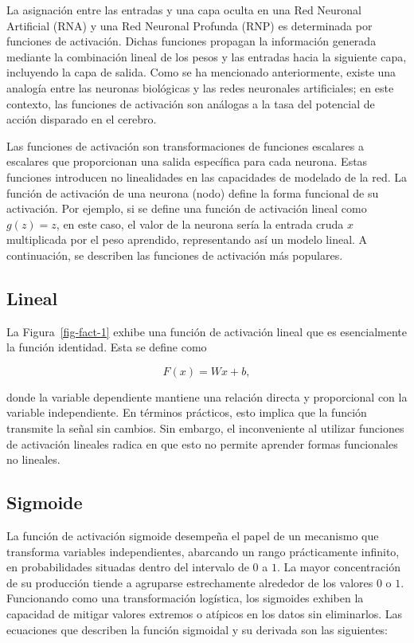 \documentclass[
  us-letterpaper,
]{scrreprt}
\theoremstyle{definition}
\theoremstyle{plain}
\theoremstyle{plain}
\theoremstyle{definition}
\theoremstyle{remark}
\begin{document}
La asignación entre las entradas y una capa oculta en una Red Neuronal
Artificial (RNA) y una Red Neuronal Profunda (RNP) es determinada por
funciones de activación. Dichas funciones propagan la información
generada mediante la combinación lineal de los pesos y las entradas
hacia la siguiente capa, incluyendo la capa de salida. Como se ha
mencionado anteriormente, existe una analogía entre las neuronas
biológicas y las redes neuronales artificiales; en este contexto, las
funciones de activación son análogas a la tasa del potencial de acción
disparado en el cerebro.

Las funciones de activación son transformaciones de funciones escalares
a escalares que proporcionan una salida específica para cada neurona.
Estas funciones introducen no linealidades en las capacidades de
modelado de la red. La función de activación de una neurona (nodo)
define la forma funcional de su activación. Por ejemplo, si se define
una función de activación lineal como \(g(z) = z\), en este caso, el
valor de la neurona sería la entrada cruda \(x\) multiplicada por el
peso aprendido, representando así un modelo lineal. A continuación, se
describen las funciones de activación más populares.

\subsection{Lineal}\label{lineal}

La Figura~\ref{fig-fact-1} exhibe una función de activación lineal que
es esencialmente la función identidad. Esta se define como

\[
F(x)=Wx + b,
\]

donde la variable dependiente mantiene una relación directa y
proporcional con la variable independiente. En términos prácticos, esto
implica que la función transmite la señal sin cambios. Sin embargo, el
inconveniente al utilizar funciones de activación lineales radica en que
esto no permite aprender formas funcionales no lineales.

\subsection{Sigmoide}\label{sigmoide}

La función de activación sigmoide desempeña el papel de un mecanismo que
transforma variables independientes, abarcando un rango prácticamente
infinito, en probabilidades situadas dentro del intervalo de \(0\) a
\(1\). La mayor concentración de su producción tiende a agruparse
estrechamente alrededor de los valores \(0\) o \(1\). Funcionando como
una transformación logística, los sigmoides exhiben la capacidad de
mitigar valores extremos o atípicos en los datos sin eliminarlos. Las
ecuaciones que describen la función sigmoidal y su derivada son las
siguientes:
\end{document}
